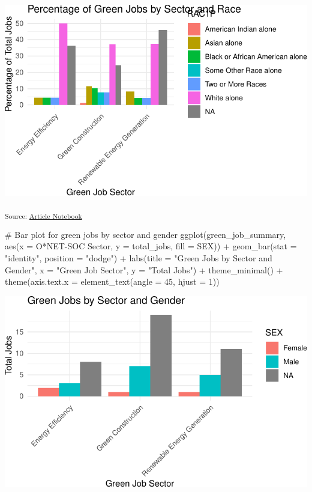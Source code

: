 \documentclass[
  letterpaper,
  DIV=11,
  numbers=noendperiod]{scrartcl}
\newenvironment{Shaded}{\begin{snugshade}}{\end{snugshade}}
\newcommand{\AttributeTok}[1]{\textcolor[rgb]{0.40,0.45,0.13}{#1}}
\newcommand{\CommentTok}[1]{\textcolor[rgb]{0.37,0.37,0.37}{#1}}
\newcommand{\DecValTok}[1]{\textcolor[rgb]{0.68,0.00,0.00}{#1}}
\newcommand{\FunctionTok}[1]{\textcolor[rgb]{0.28,0.35,0.67}{#1}}
\newcommand{\NormalTok}[1]{\textcolor[rgb]{0.00,0.23,0.31}{#1}}
\newcommand{\SpecialCharTok}[1]{\textcolor[rgb]{0.37,0.37,0.37}{#1}}
\newcommand{\StringTok}[1]{\textcolor[rgb]{0.13,0.47,0.30}{#1}}
\begin{document}
\includegraphics{index_files/figure-pdf/unnamed-chunk-46-2.pdf}

\textsubscript{Source:
\href{https://beeckcenter.github.io/climate-equity-workforce/index-preview.html}{Article
Notebook}}

\begin{Shaded}
\begin{Highlighting}[]
\CommentTok{\# Bar plot for green jobs by sector and gender}
\FunctionTok{ggplot}\NormalTok{(green\_job\_summary, }\FunctionTok{aes}\NormalTok{(}\AttributeTok{x =} \StringTok{\textasciigrave{}}\AttributeTok{O*NET{-}SOC Sector}\StringTok{\textasciigrave{}}\NormalTok{, }\AttributeTok{y =}\NormalTok{ total\_jobs, }\AttributeTok{fill =}\NormalTok{ SEX)) }\SpecialCharTok{+}
  \FunctionTok{geom\_bar}\NormalTok{(}\AttributeTok{stat =} \StringTok{"identity"}\NormalTok{, }\AttributeTok{position =} \StringTok{"dodge"}\NormalTok{) }\SpecialCharTok{+}
  \FunctionTok{labs}\NormalTok{(}\AttributeTok{title =} \StringTok{"Green Jobs by Sector and Gender"}\NormalTok{,}
       \AttributeTok{x =} \StringTok{"Green Job Sector"}\NormalTok{, }\AttributeTok{y =} \StringTok{"Total Jobs"}\NormalTok{) }\SpecialCharTok{+}
  \FunctionTok{theme\_minimal}\NormalTok{() }\SpecialCharTok{+}
  \FunctionTok{theme}\NormalTok{(}\AttributeTok{axis.text.x =} \FunctionTok{element\_text}\NormalTok{(}\AttributeTok{angle =} \DecValTok{45}\NormalTok{, }\AttributeTok{hjust =} \DecValTok{1}\NormalTok{))}
\end{Highlighting}
\end{Shaded}

\includegraphics{index_files/figure-pdf/unnamed-chunk-47-1.pdf}
\end{document}
